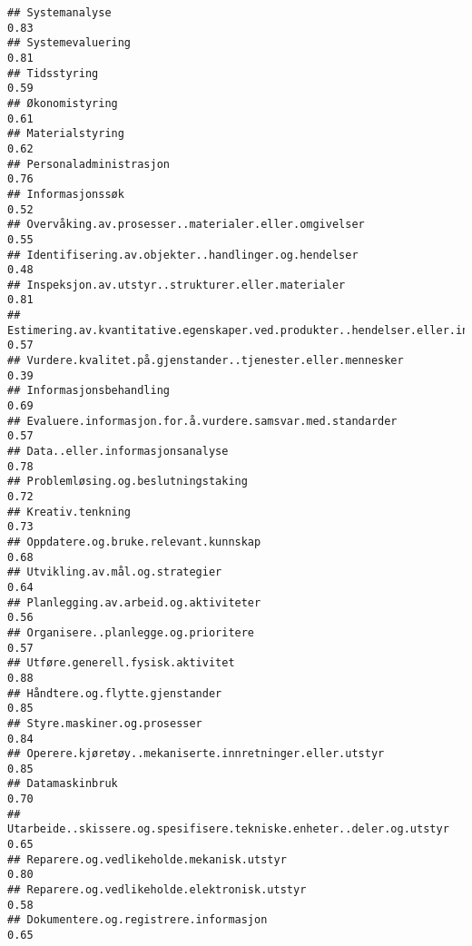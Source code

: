 \documentclass[
]{article}
\begin{document}
\begin{verbatim}
## Systemanalyse                                                                    0.83
## Systemevaluering                                                                 0.81
## Tidsstyring                                                                      0.59
## Økonomistyring                                                                   0.61
## Materialstyring                                                                  0.62
## Personaladministrasjon                                                           0.76
## Informasjonssøk                                                                  0.52
## Overvåking.av.prosesser..materialer.eller.omgivelser                             0.55
## Identifisering.av.objekter..handlinger.og.hendelser                              0.48
## Inspeksjon.av.utstyr..strukturer.eller.materialer                                0.81
## Estimering.av.kvantitative.egenskaper.ved.produkter..hendelser.eller.informasjon 0.57
## Vurdere.kvalitet.på.gjenstander..tjenester.eller.mennesker                       0.39
## Informasjonsbehandling                                                           0.69
## Evaluere.informasjon.for.å.vurdere.samsvar.med.standarder                        0.57
## Data..eller.informasjonsanalyse                                                  0.78
## Problemløsing.og.beslutningstaking                                               0.72
## Kreativ.tenkning                                                                 0.73
## Oppdatere.og.bruke.relevant.kunnskap                                             0.68
## Utvikling.av.mål.og.strategier                                                   0.64
## Planlegging.av.arbeid.og.aktiviteter                                             0.56
## Organisere..planlegge.og.prioritere                                              0.57
## Utføre.generell.fysisk.aktivitet                                                 0.88
## Håndtere.og.flytte.gjenstander                                                   0.85
## Styre.maskiner.og.prosesser                                                      0.84
## Operere.kjøretøy..mekaniserte.innretninger.eller.utstyr                          0.85
## Datamaskinbruk                                                                   0.70
## Utarbeide..skissere.og.spesifisere.tekniske.enheter..deler.og.utstyr             0.65
## Reparere.og.vedlikeholde.mekanisk.utstyr                                         0.80
## Reparere.og.vedlikeholde.elektronisk.utstyr                                      0.58
## Dokumentere.og.registrere.informasjon                                            0.65

\end{verbatim}
\end{document}
